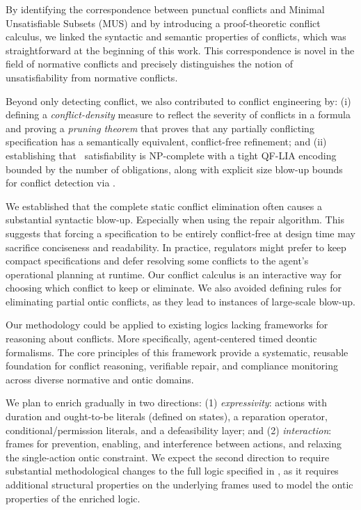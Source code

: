 

By identifying the correspondence between punctual conflicts and Minimal Unsatisfiable Subsets (MUS) and by introducing a proof-theoretic conflict calculus, we linked the syntactic and semantic properties of conflicts, which was straightforward at the beginning of this work. This correspondence is novel in the field of normative conflicts and precisely distinguishes the notion of unsatisfiability from normative conflicts.



Beyond only detecting conflict, we also contributed to conflict engineering by: (i) defining a \emph{conflict-density} measure  to  reflect the severity  of conflicts in a formula and proving a \emph{pruning theorem} that proves that any partially conflicting specification has a semantically equivalent, conflict-free refinement; and (ii) establishing that \TDDLfm\ satisfiability is NP-complete with a tight QF-LIA encoding bounded by the number of obligations, along with explicit size blow-up bounds for conflict detection via \dpnf.



We established that the complete static conflict elimination often causes a substantial syntactic blow-up. Especially when using the \dpnf repair algorithm. This suggests that forcing a specification to be entirely conflict-free at design time may sacrifice conciseness and readability. In practice, regulators might prefer to keep compact specifications and defer resolving some conflicts to the agent's operational planning at runtime. Our conflict calculus is an interactive way for choosing which conflict to keep or eliminate. We also avoided defining rules for eliminating partial ontic conflicts, as they lead to instances of large-scale blow-up.












 Our methodology could be applied to existing logics lacking frameworks for reasoning about conflicts. More specifically, agent-centered timed deontic formalisms. The core principles of this framework provide a systematic, reusable foundation for conflict reasoning, verifiable repair, and compliance monitoring across diverse normative  and ontic domains.





We plan to enrich \TDDLfm gradually in two directions: (1) \emph{expressivity}: actions with duration and ought-to-be literals (defined on states), a reparation operator, conditional/permission literals, and a defeasibility layer; and (2) \emph{interaction}: frames for prevention, enabling, and interference between actions, and relaxing the single-action ontic constraint. We expect the second direction to require substantial methodological changes to the full logic specified in \cite{kharraz2021timed}, as it requires additional structural properties on the underlying frames used to model the ontic properties of the enriched logic.



